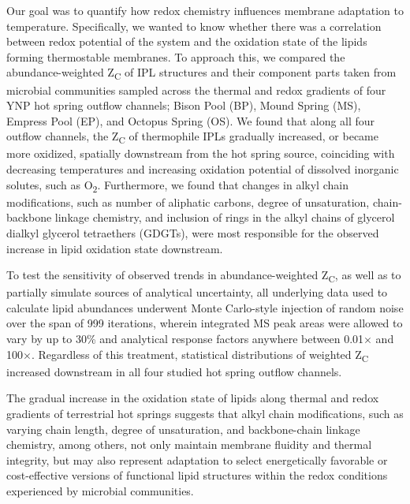 Our goal was to quantify how redox chemistry influences membrane adaptation to temperature. Specifically, we wanted to know whether there was a correlation between redox potential of the system and the oxidation state of the lipids forming thermostable membranes. To approach this, we compared the abundance-weighted Z\textsubscript{C} of IPL structures and their component parts taken from microbial communities sampled across the thermal and redox gradients of four YNP hot spring outflow channels; Bison Pool (BP), Mound Spring (MS), Empress Pool (EP), and Octopus Spring (OS). We found that along all four outflow channels, the Z\textsubscript{C} of thermophile IPLs gradually increased, or became more oxidized, spatially downstream from the hot spring source, coinciding with decreasing temperatures and increasing oxidation potential of dissolved inorganic solutes, such as O\textsubscript{2}. Furthermore, we found that changes in alkyl chain modifications, such as number of aliphatic carbons, degree of unsaturation, chain-backbone linkage chemistry, and inclusion of rings in the alkyl chains of glycerol dialkyl glycerol tetraethers (GDGTs), were most responsible for the observed increase in lipid oxidation state downstream.

To test the sensitivity of observed trends in abundance-weighted Z\textsubscript{C}, as well as to partially simulate sources of analytical uncertainty, all underlying data used to calculate lipid abundances underwent Monte Carlo-style injection of random noise over the span of 999 iterations, wherein integrated MS peak areas were allowed to vary by up to 30\% and analytical response factors anywhere between 0.01$\times$ and 100$\times$. Regardless of this treatment, statistical distributions of weighted Z\textsubscript{C} increased downstream in all four studied hot spring outflow channels.

The gradual increase in the oxidation state of lipids along thermal and redox gradients of terrestrial hot springs suggests that alkyl chain modifications, such as varying chain length, degree of unsaturation, and backbone-chain linkage chemistry, among others, not only maintain membrane fluidity and thermal integrity, but may also represent adaptation to select energetically favorable or cost-effective versions of functional lipid structures within the redox conditions experienced by microbial communities.


